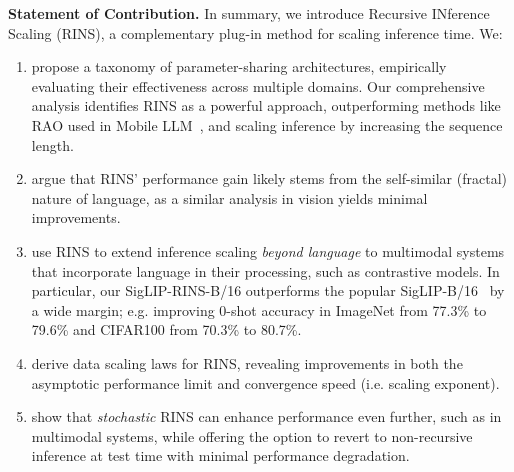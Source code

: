 \textbf{Statement of Contribution.} In summary, we introduce Recursive INference Scaling (RINS), a complementary plug-in method for scaling inference time. We:
\begin{enumerate}
\item propose a taxonomy of parameter-sharing architectures, empirically evaluating their effectiveness across multiple domains. Our comprehensive analysis identifies RINS as a powerful approach, outperforming methods like RAO used in Mobile LLM~\cite{liu2024mobilellm}, and scaling inference by increasing the sequence length.
\item argue that RINS' performance gain likely stems from the self-similar (fractal) nature of language, as a similar analysis in vision yields minimal improvements.
\item use RINS to extend inference scaling \emph{beyond language} to multimodal systems that incorporate language in their processing, such as contrastive models. In particular, our SigLIP-RINS-B/16 outperforms the popular SigLIP-B/16~\cite{zhai2023sigmoidlosslanguageimage} by a wide margin; e.g. improving 0-shot accuracy in ImageNet from 77.3\% to 79.6\% and CIFAR100 from 70.3\% to 80.7\%.
\item derive data scaling laws for RINS, revealing improvements in both the asymptotic performance limit and convergence speed (i.e. scaling exponent).
\item show that \emph{stochastic} RINS can enhance performance even further, such as in multimodal systems, while offering the option to revert to non-recursive inference at test time with minimal performance degradation.
\end{enumerate}

